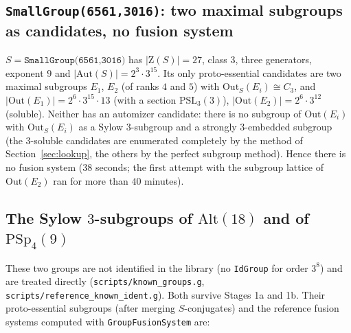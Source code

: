 \documentclass[11pt]{article}
\theoremstyle{definition}
\theoremstyle{remark}
\newcommand{\Aut}{\mathrm{Aut}}
\newcommand{\Out}{\mathrm{Out}}
\newcommand{\PSL}{\mathrm{PSL}}
\newcommand{\PSp}{\mathrm{PSp}}
\newcommand{\Alt}{\mathrm{Alt}}
\newcommand{\Z}{\mathrm{Z}}
\begin{document}
\subsection{\texttt{SmallGroup(6561,3016)}: two maximal subgroups as candidates, no fusion system}
\label{sec:3016}

$S=\texttt{SmallGroup(6561,3016)}$ has $|\Z(S)|=27$, class $3$, three
generators, exponent $9$ and $|\Aut(S)|=2^3\cdot3^{15}$.  Its only
proto-essential candidates are two maximal subgroups $E_1$, $E_2$ (of
ranks $4$ and $5$) with $\Out_S(E_i)\cong C_3$, and
$|\Out(E_1)|=2^6\cdot3^{15}\cdot13$ (with a section $\PSL_3(3)$),
$|\Out(E_2)|=2^6\cdot3^{12}$ (soluble).  Neither has an automizer
candidate: there is no subgroup of $\Out(E_i)$ with $\Out_S(E_i)$ as a
Sylow $3$-subgroup and a strongly $3$-embedded subgroup (the
$3$-soluble candidates are enumerated completely by the method of
Section~\ref{sec:lookup}, the others by the perfect subgroup method).
Hence there is no fusion system ($38$ seconds; the first attempt with the
subgroup lattice of $\Out(E_2)$ ran for more than $40$ minutes).

\subsection{The Sylow $3$-subgroups of $\Alt(18)$ and of $\PSp_4(9)$}
\label{sec:known}

These two groups are not identified in the library (no \texttt{IdGroup}
for order $3^8$) and are treated directly (\texttt{scripts/known\_groups.g},
\texttt{scripts/reference\_known\_ident.g}).  Both survive Stages 1a and
1b.  Their proto-essential subgroups (after merging $S$-conjugates) and the
reference fusion systems computed with \texttt{GroupFusionSystem} are:
\end{document}

